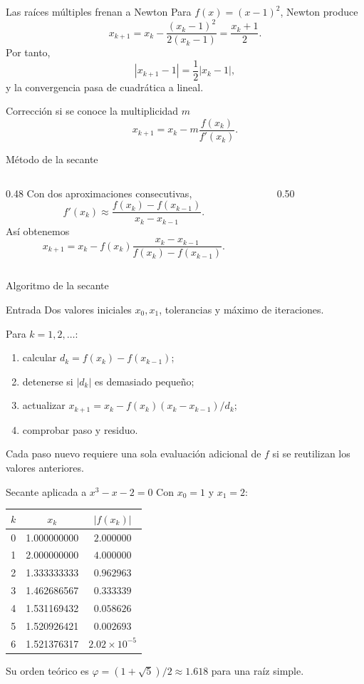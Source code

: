 \documentclass[aspectratio=169,12pt]{beamer}
\begin{document}
\begin{frame}{Las raíces múltiples frenan a Newton}
Para $f(x)=(x-1)^2$, Newton produce
\[
x_{k+1}=x_k-\frac{(x_k-1)^2}{2(x_k-1)}
=\frac{x_k+1}{2}.
\]
Por tanto,
\[
|x_{k+1}-1|=\frac12|x_k-1|,
\]
y la convergencia pasa de cuadrática a lineal.
\begin{block}{Corrección si se conoce la multiplicidad $m$}
\[
x_{k+1}=x_k-m\frac{f(x_k)}{f'(x_k)}.
\]
\end{block}
\end{frame}

\begin{frame}{Método de la secante}
\begin{columns}[T,onlytextwidth]
\begin{column}{0.48\textwidth}
Con dos aproximaciones consecutivas,
\[
f'(x_k)\approx
\frac{f(x_k)-f(x_{k-1})}{x_k-x_{k-1}}.
\]
Así obtenemos
\[
x_{k+1}=x_k-f(x_k)
\frac{x_k-x_{k-1}}{f(x_k)-f(x_{k-1})}.
\]
\end{column}
\begin{column}{0.50\textwidth}
\centering
\resizebox{\linewidth}{!}{}
\end{column}
\end{columns}
\end{frame}

\begin{frame}{Algoritmo de la secante}
\begin{block}{Entrada}
Dos valores iniciales $x_0,x_1$, tolerancias y máximo de iteraciones.
\end{block}
Para $k=1,2,\ldots$:
\begin{enumerate}
  \item calcular $d_k=f(x_k)-f(x_{k-1})$;
  \item detenerse si $|d_k|$ es demasiado pequeño;
  \item actualizar $x_{k+1}=x_k-f(x_k)(x_k-x_{k-1})/d_k$;
  \item comprobar paso y residuo.
\end{enumerate}
Cada paso nuevo requiere una sola evaluación adicional de $f$ si se reutilizan
los valores anteriores.
\end{frame}

\begin{frame}{Secante aplicada a $x^3-x-2=0$}
Con $x_0=1$ y $x_1=2$:
\centering
\begin{tabular}{ccc}
\toprule
$k$ & $x_k$ & $|f(x_k)|$ \\
\midrule
0 & 1.000000000 & $2.000000$ \\
1 & 2.000000000 & $4.000000$ \\
2 & 1.333333333 & $0.962963$ \\
3 & 1.462686567 & $0.333339$ \\
4 & 1.531169432 & $0.058626$ \\
5 & 1.520926421 & $0.002693$ \\
6 & 1.521376317 & $2.02\times10^{-5}$ \\
\bottomrule
\end{tabular}

Su orden teórico es $\varphi=(1+\sqrt5)/2\approx1.618$ para una raíz simple.
\end{frame}
\end{document}
